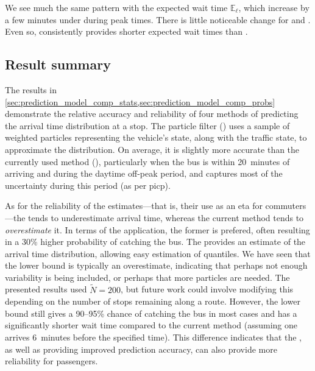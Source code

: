 We see much the same pattern with the expected wait time $\mathbb{E}_\ell$, which increase by a few minutes under \Fpf{} during peak times. There is little noticeable change for \Fsched{} and \Fhist{}. Even so, \Fpf{} consistently provides shorter expected wait times than \Fsched{}.


\subsection{Result summary}
\label{sec:prediction_model_comp_summary}

The results in \cref{sec:prediction_model_comp_stats,sec:prediction_model_comp_probs} demonstrate the relative accuracy and reliability of four methods of predicting the arrival time distribution at a stop. The particle filter (\Fpf{}) uses a sample of weighted particles representing the vehicle's state, along with the \rt{} traffic state, to approximate the distribution. On average, it is slightly more accurate than the currently used method (\Fsched{}), particularly when the bus is within 20~minutes of arriving and during the daytime off-peak period, and captures most of the uncertainty during this period (as per \gls{picp}).

As for the reliability of the estimates---that is, their use as an \gls{eta} for commuters---the \pf{} tends to underestimate arrival time, whereas the current method tends to \emph{overestimate} it. In terms of the application, the former is prefered, often resulting in a 30\% higher probability of catching the bus. The \pf{} provides an estimate of the arrival time distribution, allowing easy estimation of quantiles. We have seen that the lower bound is typically an overestimate, indicating that perhaps not enough variability is being included, or perhaps that more particles are needed. The presented results used $\tilde N = 200$, but future work could involve modifying this depending on the number of stops remaining along a route. However, the lower bound still gives a 90--95\% chance of catching the bus in most cases and has a significantly shorter wait time compared to the current method (assuming one arrives 6~minutes before the specified time). This difference indicates that the \pf{}, as well as providing improved prediction accuracy, can also provide more reliability for passengers.


